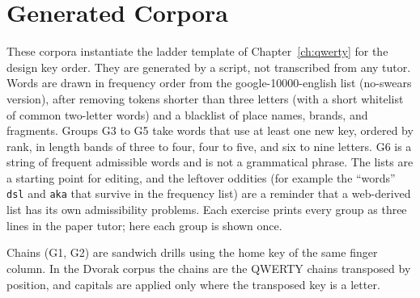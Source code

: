 \chapter{Generated Corpora}

These corpora instantiate the ladder template of Chapter~\ref{ch:qwerty} for the design key order. They are generated by a script, not transcribed from any tutor. Words are drawn in frequency order from the google-10000-english list (no-swears version), after removing tokens shorter than three letters (with a short whitelist of common two-letter words) and a blacklist of place names, brands, and fragments. Groups G3 to G5 take words that use at least one new key, ordered by rank, in length bands of three to four, four to five, and six to nine letters. G6 is a string of frequent admissible words and is not a grammatical phrase. The lists are a starting point for editing, and the leftover oddities (for example the ``words'' \texttt{dsl} and \texttt{aka} that survive in the frequency list) are a reminder that a web-derived list has its own admissibility problems. Each exercise prints every group as three lines in the paper tutor; here each group is shown once.

Chains (G1, G2) are sandwich drills using the home key of the same finger column. In the Dvorak corpus the chains are the QWERTY chains transposed by position, and capitals are applied only where the transposed key is a letter.

